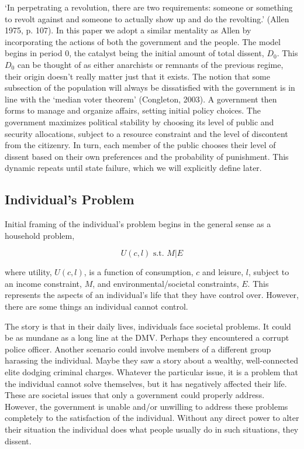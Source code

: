 \documentclass[12pt]{article}
\begin{document}
\begin{spacing}{1.5}
`In perpetrating a revolution, there are two requirements: someone or something to revolt against and someone to actually show up and do the revolting.' (Allen 1975, p. 107). In this paper we adopt a similar mentality as Allen by incorporating the actions of both the government and the people. The model begins in period 0, the catalyst being the initial amount of total dissent, $D_0$. This $D_0$ can be thought of as either anarchists or remnants of the previous regime, their origin doesn't really matter just that it exists. The notion that some subsection of the population will always be dissatisfied with the government is in line with the `median voter theorem' (Congleton, 2003). A government then forms to manage and organize affairs, setting initial policy choices. The government maximizes political stability by choosing its level of public and security allocations, subject to a resource constraint and the level of discontent from the citizenry. In turn, each member of the public chooses their level of dissent based on their own preferences and the probability of punishment. This dynamic repeats until state failure, which we will explicitly define later. 
 
\subsection{Individual's Problem}

Initial framing of the individual's problem  begins in the general sense as a household problem, 

\begin{equation}
	U(c,l) \text{ s.t. } M|E
\end{equation}

\noindent where utility, $U(c,l)$, is a function of consumption, $c$ and leisure, $l$, subject to an income constraint, $M$, and environmental/societal constraints, $E$. This represents the aspects of an individual's life that they have control over. However, there are some things an individual cannot control.  

The story is that in their daily lives, individuals face societal problems. It could be as mundane as a long line at the DMV. Perhaps they encountered a corrupt police officer. Another scenario could involve members of a different group harassing the individual. Maybe they saw a story about a wealthy, well-connected elite dodging criminal charges. Whatever the particular issue, it is a problem that the individual cannot solve themselves, but it has negatively affected their life. These are societal issues that only a government could properly address. However, the government is unable and/or unwilling to address these problems completely to the satisfaction of the individual. Without any direct power to alter their situation the individual does what people usually do in such situations, they dissent. 


\end{spacing}
\end{document}
